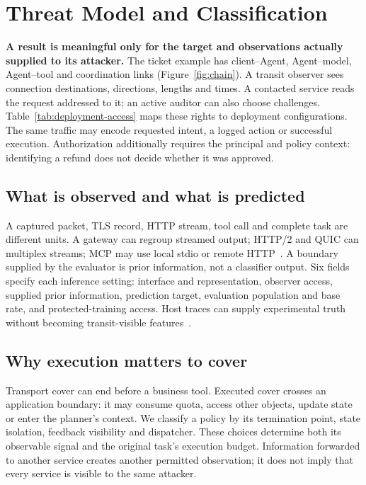 \section{Threat Model and Classification}\label{sec:taxonomy}
\textbf{A result is meaningful only for the target and observations actually supplied to its attacker.}
The ticket example has client--Agent, Agent--model, Agent--tool and coordination links (Figure~\ref{fig:chain}). A transit observer sees connection destinations, directions, lengths and times. A contacted service reads the request addressed to it; an active auditor can also choose challenges. Table~\ref{tab:deployment-access} maps these rights to deployment configurations. The same traffic may encode requested intent, a logged action or successful execution. Authorization additionally requires the principal and policy context: identifying a refund does not decide whether it was approved.



\subsection{What is observed and what is predicted}
A captured packet, TLS record, HTTP stream, tool call and complete task are different units. A gateway can regroup streamed output; HTTP/2 and QUIC can multiplex streams; MCP may use local stdio or remote HTTP~\cite{mcp2025transports,rfc9113,rfc9114,rfc9000,rfc8446}. A boundary supplied by the evaluator is prior information, not a classifier output. Six fields specify each inference setting: interface and representation, observer access, supplied prior information, prediction target, evaluation population and base rate, and protected-training access. Host traces can supply experimental truth without becoming transit-visible features~\cite{reynolds2006wap5,tak2009vpath}.

\subsection{Why execution matters to cover}
Transport cover can end before a business tool. Executed cover crosses an application boundary: it may consume quota, access other objects, update state or enter the planner's context. We classify a policy by its termination point, state isolation, feedback visibility and dispatcher. These choices determine both its observable signal and the original task's execution budget. Information forwarded to another service creates another permitted observation; it does not imply that every service is visible to the same attacker.
